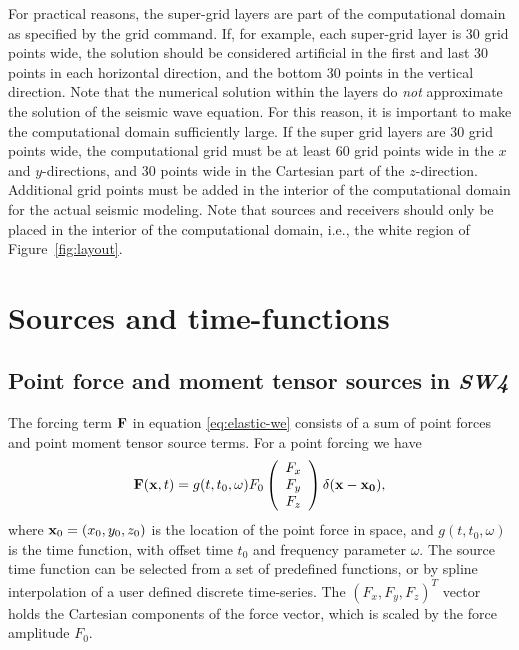 \documentclass[11pt]{report}
\begin{document}
For practical reasons, the super-grid layers are part of the computational domain as specified by
the grid command. If, for example, each super-grid layer is 30 grid points wide, the solution
should be considered artificial in the first and last 30 points in each horizontal direction, and
the bottom 30 points in the vertical direction. Note that the numerical solution within the layers
do {\em not} approximate the solution of the seismic wave equation. For this reason, it is important
to make the computational domain sufficiently large. If the super grid layers are 30 grid points
wide, the computational grid must be at least 60 grid points wide in the $x$ and $y$-directions, and
30 points wide in the Cartesian part of the $z$-direction. Additional grid points must be added in
the interior of the computational domain for the actual seismic modeling. Note that sources and
receivers should only be placed in the interior of the computational domain, i.e., the white region
of Figure~\ref{fig:layout}.

\chapter{Sources and time-functions}


\section{Point force and moment tensor sources in \emph{SW4}}\label{sec:time-functions}
The forcing term ${\bf F}$ in equation \eqref{eq:elastic-we} consists of a sum of point forces and
point moment tensor source terms. For a point forcing we have
\[
{\bf F}({\bf x},t) = g(t,t_0,\omega) F_0 \left(\begin{array}{c}
  F_x\\ F_y\\ F_z\end{array}\right) \delta ({\bf x} - {\bf x_0}),
\]
where ${\bf x}_0=(x_0,y_0,z_0)$ is the location of the point force in space, and $g(t,t_0,\omega)$
is the time function, with offset time $t_0$ and frequency parameter $\omega$. The source time
function can be selected from a set of predefined functions, or by spline interpolation of a user
defined discrete time-series. The $(F_x,F_y,F_z)^T$ vector holds the Cartesian components of the force
vector, which is scaled by the force amplitude $F_0$. 
\end{document}
